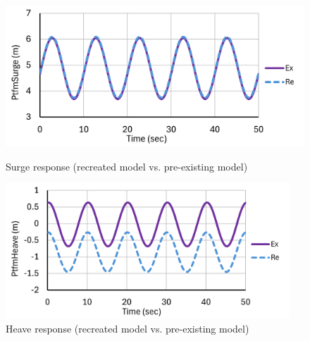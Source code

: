 \documentclass[a4paper, 11pt]{article}
\begin{document}
\begin{figure}[H]
    \begin{minipage}{0.48\textwidth}
        \centering
        \includegraphics[width=1\textwidth]{3.1_surge_mine.png}
        \caption{\small Surge response (recreated model vs. pre-existing model)}
        \label{fig:3.1_surge_mine_recreated}
    \end{minipage}
    \hfill
    \begin{minipage}{0.5\textwidth}
        \centering
        \includegraphics[width=0.95\textwidth]{3.1_heave_mine.png}
        \caption{\small Heave response (recreated model vs. pre-existing model)}
        \label{fig:3.1_heave_mine_recreated}
    \end{minipage}
\end{figure}
\end{document}
